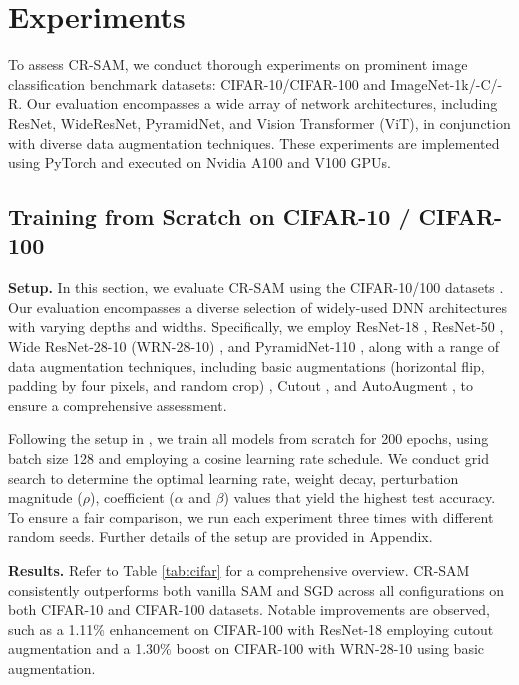 \documentclass[letterpaper]{article} %
\theoremstyle{plain}
\theoremstyle{definition}
\begin{document}
\section{Experiments}
\label{sec:experiments}

To assess CR-SAM, we conduct thorough experiments on prominent image classification benchmark datasets: CIFAR-10/CIFAR-100 and ImageNet-1k/-C/-R. Our evaluation encompasses a wide array of network architectures, including ResNet, WideResNet, PyramidNet, and Vision Transformer (ViT), in conjunction with diverse data augmentation techniques. These experiments are implemented using PyTorch and executed on Nvidia A100 and V100 GPUs.

\subsection{Training from Scratch on CIFAR-10 / CIFAR-100}
\label{subsec: cifar}

\textbf{Setup.} 
In this section, we evaluate CR-SAM using the CIFAR-10/100 datasets \cite{krizhevsky2009learning}. Our evaluation encompasses a diverse selection of widely-used DNN architectures with varying depths and widths. Specifically, we employ ResNet-18 \cite{he2016deep}, ResNet-50 \cite{he2016deep}, Wide ResNet-28-10 (WRN-28-10) \cite{zagoruyko2016wide}, and PyramidNet-110 \cite{han2017deep}, along with a range of data augmentation techniques, including basic augmentations (horizontal flip, padding by four pixels, and random crop) \cite{foret2021sharpnessaware}, Cutout \cite{devries2017improved}, and AutoAugment \cite{cubuk2018autoaugment}, to ensure a comprehensive assessment.

Following the setup in \cite{liu2022random, du2022sharpness}, we train all models from scratch for 200 epochs, using batch size 128 and employing a cosine learning rate schedule. We conduct grid search to determine the optimal learning rate, weight decay, perturbation magnitude ($\rho$), coefficient ($\alpha$ and $\beta$) values that yield the highest test accuracy. To ensure a fair comparison, we run each experiment three times with different random seeds. Further details of the setup are provided in Appendix.

\textbf{Results.}
Refer to Table \ref{tab:cifar} for a comprehensive overview. CR-SAM consistently outperforms both vanilla SAM and SGD across all configurations on both CIFAR-10 and CIFAR-100 datasets. Notable improvements are observed, such as a 1.11\% enhancement on CIFAR-100 with ResNet-18 employing cutout augmentation and a 1.30\% boost on CIFAR-100 with WRN-28-10 using basic augmentation. 
\end{document}
